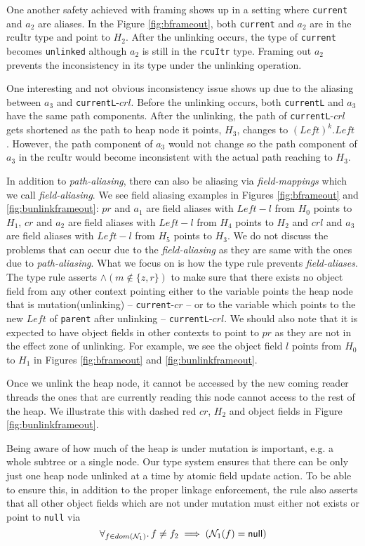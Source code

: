One another safety achieved with framing shows up in a setting where \texttt{current} and $a_2$ are aliases. In the Figure \ref{fig:bframeout}, both \texttt{current} and $a_2$ are in the \textsf{rcuItr} type and point to $H_2$. After the unlinking occurs, the type of \texttt{current} becomes \texttt{unlinked} although $a_2$ is still in the \texttt{rcuItr} type. Framing out $a_2$ prevents the inconsistency in its type under the unlinking operation.

One interesting and not obvious inconsistency issue shows up due to the aliasing between $a_3$ and \texttt{currentL}-$crl$. Before the unlinking occurs, both \texttt{currentL} and $a_3$ have the same path components. After the unlinking, the path of \texttt{currentL}-$crl$ gets shortened as the path to heap node it points, $H_3$, changes  to $(Left)^{k}.Left$ . However, the path component of $a_3$  would not change so the path component of $a_3$ in the \textsf{rcuItr} would become inconsistent with the actual path reaching to $H_3$.

In addition to \textit{path-aliasing}, there can also be aliasing via \textit{field-mappings} which we call \textit{field-aliasing}. We see field aliasing examples in Figures \ref{fig:bframeout} and \ref{fig:bunlinkframeout}: $pr$ and $a_1$ are field aliases with $Left-l$ from $H_0$ points to $H_1$, $cr$ and $a_2$ are field aliases with $Left-l$ from $H_4$ points to $H_2$  and $crl$ and $a_3$ are field aliases with $Left-l$ from $H_5$ points to $H_3$. We do not discuss the problems that can occur due to the \textit{field-aliasing} as they are same with the ones due to \textit{path-aliasing}. What we focus on is how the type rule prevents \textit{field-aliases}. The type rule asserts $ \land (m\not\in\{z,r\} )$ to make sure that there exists no object field from any other context pointing either to the variable points the heap node that is mutation(unlinking) -- \texttt{current}-$cr$ -- or to the variable which points to the new $Left$ of \texttt{parent} after unlinking -- \texttt{currentL}-$crl$. We should also note that it is expected to have object fields in other contexts to point to $pr$ as they are not in the effect zone of unlinking. For example, we see the object field $l$ points from $H_0$ to  $H_1$ in Figures \ref{fig:bframeout} and \ref{fig:bunlinkframeout}.

Once we unlink the heap node, it cannot be accessed by the new coming reader threads the ones that are currently reading this node cannot access to the rest of the heap. We illustrate this with dashed red $cr$, $H_2$ and object fields in Figure \ref{fig:bunlinkframeout}.

Being aware of how much of the heap is under mutation is important, e.g. a whole subtree or a single node. Our type system ensures that there can be only just one heap node unlinked at a time by atomic field update action. To be able to ensure this, in addition to the proper linkage enforcement, the rule also asserts that all other object fields which are not under mutation must either not exists or point to \texttt{null} via
\[\forall_{f\in dom(\mathcal{N}_1)} \ldotp f\neq f_2 \implies (\mathcal{N}_1(f) = \textsf{null})\] 
